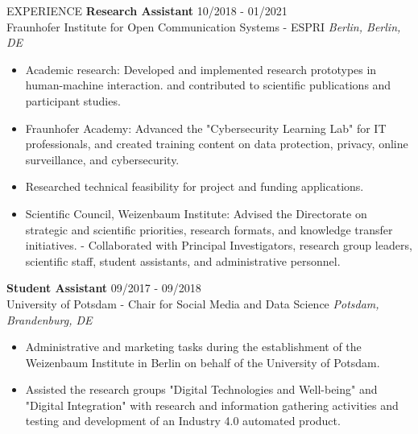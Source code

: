 \documentclass{resume} %
\begin{document}
\begin{rSection}{EXPERIENCE}
 \textbf{Research Assistant} \hfill 10/2018 - 01/2021\\
Fraunhofer Institute for Open Communication Systems - ESPRI \hfill \textit{Berlin, Berlin, DE}
 \begin{itemize}
    \itemsep -3pt {} 
    \item Academic research: Developed and implemented research prototypes in human-machine interaction. and contributed to scientific publications and participant studies.
    \item Fraunhofer Academy: Advanced the "Cybersecurity Learning Lab" for IT professionals, and created training content on data protection, privacy, online surveillance, and cybersecurity.
    \item Researched technical feasibility for project and funding applications.
    \item   Scientific Council, Weizenbaum Institute: Advised the Directorate on strategic and scientific priorities, research formats, and knowledge transfer initiatives.
  - Collaborated with Principal Investigators, research group leaders, scientific staff, student assistants, and administrative personnel.

 \end{itemize}

 \textbf{Student Assistant} \hfill 09/2017 - 09/2018\\
University of Potsdam - Chair for Social Media and Data Science \hfill \textit{Potsdam, Brandenburg, DE}
 \begin{itemize}
    \itemsep -3pt {} 
     \item Administrative and marketing tasks during the establishment of the Weizenbaum Institute in Berlin on behalf of the University of Potsdam.
     \item Assisted the research groups "Digital Technologies and Well-being" and "Digital Integration" with research and information gathering activities and testing and development of an Industry 4.0 automated product.
 \end{itemize}
\end{rSection} 
\end{document}
